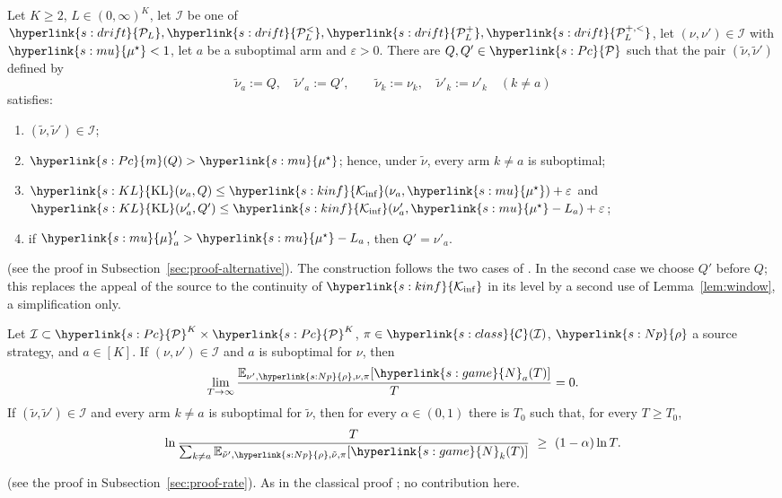 \documentclass[11pt]{article}
\newcommand{\sy}[2]{\hyperlink{#1}{#2}}
\newcommand{\E}{\mathbb{E}}
\newcommand{\Pc}{\sy{s:Pc}{\mathcal{P}}}
\newcommand{\m}{\sy{s:Pc}{m}}
\newcommand{\KL}{\sy{s:KL}{\mathrm{KL}}}
\newcommand{\Kinf}{\sy{s:kinf}{\mathcal{K}_{\inf}}}
\newcommand{\mean}{\sy{s:mu}{\mu}}
\newcommand{\ms}{\sy{s:mu}{\mu^{\star}}}
\newcommand{\rhos}{\sy{s:Np}{\rho}}
\newcommand{\Nc}{\sy{s:game}{N}}
\newcommand{\PcL}{\sy{s:drift}{\mathcal{P}_{L}}}
\newcommand{\PcLs}{\sy{s:drift}{\mathcal{P}^{<}_{L}}}
\newcommand{\PcLo}{\sy{s:drift}{\mathcal{P}^{+}_{L}}}
\newcommand{\PcLos}{\sy{s:drift}{\mathcal{P}^{+,<}_{L}}}
\newcommand{\Cl}{\sy{s:class}{\mathcal{C}}}
\begin{document}
\begin{lemma}\label{lem:alternative}
Let $K\ge2$, $L\in(0,\infty)^K$, let $\mathcal I$ be one of $\PcL,\PcLs,\PcLo,\PcLos$, let
$(\nu,\nu')\in\mathcal I$ with $\ms<1$, let $a$ be a suboptimal arm and $\varepsilon>0$. There are
$Q,Q'\in\Pc$ such that the pair $(\tilde\nu,\tilde\nu')$ defined by
\begin{equation*}
\tilde\nu_a:=Q,\quad\tilde\nu'_a:=Q',\qquad \tilde\nu_k:=\nu_k,\quad\tilde\nu'_k:=\nu'_k\quad(k\ne a)
\end{equation*}
satisfies:
\begin{enumerate}[label=(\alph*)]
\item $(\tilde\nu,\tilde\nu')\in\mathcal I$;
\item $\m(Q)>\ms$; hence, under $\tilde\nu$, every arm $k\ne a$ is suboptimal;
\item $\KL(\nu_a,Q)\le\Kinf(\nu_a,\ms)+\varepsilon$ and $\KL(\nu'_a,Q')\le\Kinf(\nu'_a,\ms-L_a)+\varepsilon$;
\item if $\mean'_a>\ms-L_a$, then $Q'=\nu'_a$.
\end{enumerate}
\end{lemma}
(see the proof in Subsection~\ref{sec:proof-alternative}). The construction follows the two cases
of \citet[Appendix~E]{PMRM26}. In the second case we choose $Q'$ before $Q$; this replaces the
appeal of the source to the continuity of $\Kinf$ in its level \citep[Lemma~2 and
Theorems~7--8]{HT10} by a second use of Lemma~\ref{lem:window}, a simplification only.

\begin{lemma}\label{lem:rate}
Let $\mathcal I\subset\Pc^K\times\Pc^K$, $\pi\in\Cl(\mathcal I)$, $\rhos$ a source strategy, and
$a\in[K]$. If $(\nu,\nu')\in\mathcal I$ and $a$ is suboptimal for $\nu$, then
\begin{equation*}
\lim_{T\to\infty}\frac{\E_{\nu',\rhos,\nu,\pi}[\Nc_a(T)]}{T}=0 .
\end{equation*}
If $(\tilde\nu,\tilde\nu')\in\mathcal I$ and every arm $k\ne a$ is suboptimal for $\tilde\nu$, then
for every $\alpha\in(0,1)$ there is $T_0$ such that, for every $T\ge T_0$,
\begin{equation*}
\ln\frac{T}{\sum_{k\ne a}\E_{\tilde\nu',\rhos,\tilde\nu,\pi}[\Nc_k(T)]}\ \ge\ (1-\alpha)\ln T .
\end{equation*}
\end{lemma}
(see the proof in Subsection~\ref{sec:proof-rate}). As in the classical proof
\citep[Theorem~1]{GMS19}; no contribution here.
\end{document}
